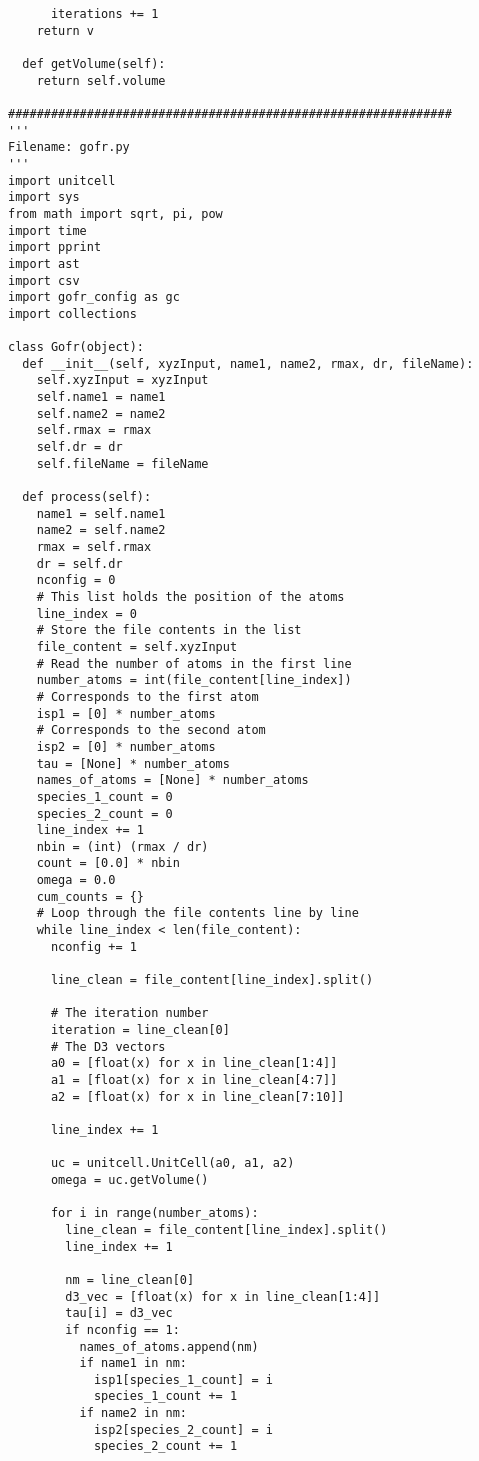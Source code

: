 \begin{verbatim}
      iterations += 1
    return v
    
  def getVolume(self):
    return self.volume
   
##############################################################
'''
Filename: gofr.py
'''
import unitcell
import sys
from math import sqrt, pi, pow
import time
import pprint
import ast
import csv
import gofr_config as gc
import collections

class Gofr(object):
  def __init__(self, xyzInput, name1, name2, rmax, dr, fileName):
    self.xyzInput = xyzInput
    self.name1 = name1
    self.name2 = name2
    self.rmax = rmax
    self.dr = dr
    self.fileName = fileName
    
  def process(self):
    name1 = self.name1
    name2 = self.name2
    rmax = self.rmax
    dr = self.dr
    nconfig = 0
    # This list holds the position of the atoms
    line_index = 0
    # Store the file contents in the list
    file_content = self.xyzInput
    # Read the number of atoms in the first line
    number_atoms = int(file_content[line_index])
    # Corresponds to the first atom
    isp1 = [0] * number_atoms
    # Corresponds to the second atom
    isp2 = [0] * number_atoms
    tau = [None] * number_atoms
    names_of_atoms = [None] * number_atoms
    species_1_count = 0
    species_2_count = 0
    line_index += 1
    nbin = (int) (rmax / dr)
    count = [0.0] * nbin
    omega = 0.0
    cum_counts = {}
    # Loop through the file contents line by line
    while line_index < len(file_content):
      nconfig += 1
    
      line_clean = file_content[line_index].split()

      # The iteration number
      iteration = line_clean[0]
      # The D3 vectors
      a0 = [float(x) for x in line_clean[1:4]]
      a1 = [float(x) for x in line_clean[4:7]]
      a2 = [float(x) for x in line_clean[7:10]]

      line_index += 1

      uc = unitcell.UnitCell(a0, a1, a2)
      omega = uc.getVolume()

      for i in range(number_atoms):
        line_clean = file_content[line_index].split()
        line_index += 1
      
        nm = line_clean[0]
        d3_vec = [float(x) for x in line_clean[1:4]]
        tau[i] = d3_vec
        if nconfig == 1:
          names_of_atoms.append(nm)
          if name1 in nm:
            isp1[species_1_count] = i
            species_1_count += 1
          if name2 in nm:
            isp2[species_2_count] = i
            species_2_count += 1
      

\end{verbatim}
